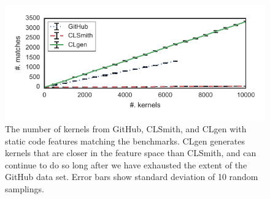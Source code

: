 \begin{figure}
  \includegraphics[width=\columnwidth]{img/closeness} %
  \caption[Number of kernels matching benchmark features]{%
    The number of kernels from GitHub, CLSmith, and CLgen with static code features matching the benchmarks. CLgen generates kernels that are closer in the feature space than CLSmith, and can continue to do so long after we have exhausted the extent of the GitHub data set. Error bars show standard deviation of 10 random samplings.%
  }%
  \label{fig:nn}
\end{figure}
